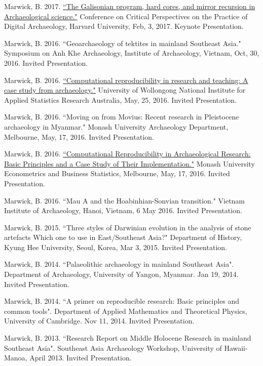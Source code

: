 \ind Marwick, B. 2017. \href{https://www.youtube.com/watch?v=k3Wv4Cnr0Nc}{``The Galisonian program, hard cores, and mirror recursion in Archaeological science."} Conference on Critical Perspectives on the Practice of Digital Archaeology, Harvard University,  Feb, 3, 2017. Keynote Presentation.

\ind Marwick, B. 2016. ``Geoarchaeology of tektites in mainland Southeast Asia." Symposium on Anh Khe Archaeology, Institute of Archaeology, Vietnam, Oct, 30, 2016. Invited Presentation.

\ind Marwick, B. 2016. \href{https://github.com/benmarwick/UOW-NIASRA-2016-talk}{``Computational reproducibility in research and teaching: A case study from archaeology."} University of Wollongong National Institute for Applied Statistics Research Australia, May, 25, 2016. Invited Presentation.

\ind Marwick, B. 2016. ``Moving on from Movius: Recent research in Pleistocene archaeology in Myanmar." Monash University Archaeology Department, Melbourne, May, 17, 2016. Invited Presentation.

\ind Marwick, B. 2016. \href{https://github.com/benmarwick/Monash-Wombat-2016-talk}{``Computational Reproducibility in Archaeological Research: Basic Principles and a Case Study of Their Implementation."} Monash University Econometrics and Business Statistics, Melbourne, May, 17, 2016. Invited Presentation.

\ind Marwick, B. 2016. ``Mau A and the Hoabinhian-Sonvian transition." Vietnam Institute of Archaeology, Hanoi, Vietnam, 6 May 2016. Invited Presentation.

\ind Marwick, B. 2015. ``Three styles of Darwinian evolution in the analysis of stone artefacts Which one to use in East/Southeast Asia?" Department of History, Kyung Hee University, Seoul, Korea, Mar 3, 2015. Invited Presentation.

\ind Marwick, B. 2014. ``Palaeolithic archaeology in mainland Southeast Asia". Department of Archaeology, University of Yangon, Myanmar. Jan 19, 2014. Invited Presentation.

\ind Marwick, B. 2014. ``A primer on reproducible research: Basic principles and common tools". Department of Applied Mathematics and Theoretical Physics, University of Cambridge. Nov 11, 2014. Invited Presentation.

\ind Marwick, B. 2013. ``Research Report on Middle Holocene Research in mainland Southeast Asia". Southeast Asia Archaeology Workshop, University of Hawaii-Manoa, April 2013. Invited Presentation.

